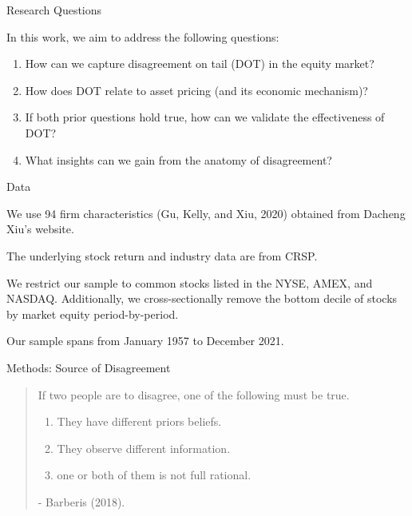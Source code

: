 \documentclass[11pt, aspectratio=169]{beamer}
\newenvironment{wideitemize}{\itemize\addtolength{\itemsep}{10pt}}{\enditemize}
\begin{document}
\begin{frame}{Research Questions}
    \bigskip
    \begin{wideitemize}
    \item In this work, we aim to address the following questions:
    \bigskip
    \begin{enumerate}
        \item How can we \alert{capture} disagreement on tail (DOT) in the equity market?
        \bigskip
        \item How does DOT relate to \alert{asset pricing} (and its economic mechanism)?
        \bigskip
        \item If both prior questions hold true, how can we \alert{validate} the effectiveness of DOT?
        \bigskip
        \item What insights can we gain from the \alert{anatomy} of disagreement?
    \end{enumerate}
    \end{wideitemize}
\end{frame}

\begin{frame}{Data}
    \bigskip
    \begin{wideitemize}
    \item We use 94 firm characteristics (Gu, Kelly, and Xiu, 2020) obtained from Dacheng Xiu's website.
    \item The underlying stock return and industry data are from CRSP.
    \item We restrict our sample to common stocks listed in the NYSE, AMEX, and NASDAQ. Additionally, we cross-sectionally remove the bottom decile of stocks by market equity period-by-period.
    \item Our sample spans from January 1957 to December 2021.
    \end{wideitemize}
\end{frame}


\begin{frame}{Methods: Source of Disagreement }
    \begin{quote}
    If two people are to disagree, one of the following must be true.
    \bigskip
    \begin{enumerate}
        \item \alert{They have different priors beliefs.}
    \bigskip
        \item They observe different information.
    \bigskip
        \item one or both of them is not full rational.
    \end{enumerate}
    \bigskip
    - Barberis (2018).
    \end{quote}
\end{frame}
\end{document}
